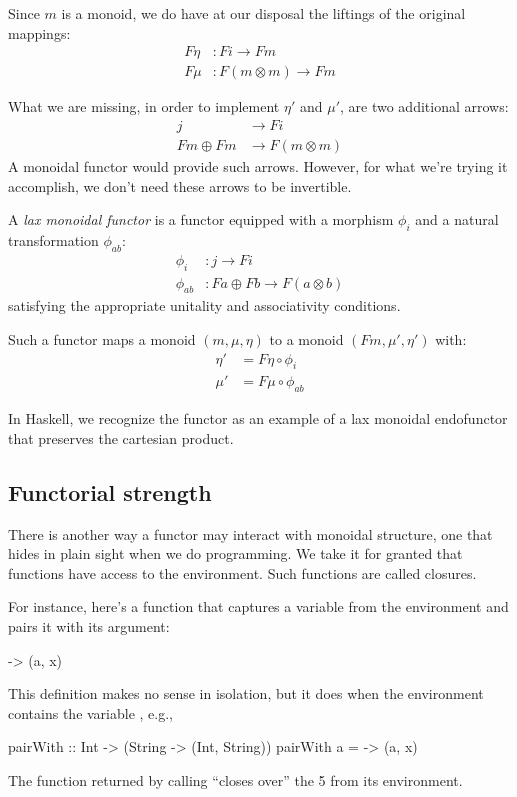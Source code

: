 \documentclass[DaoFP]{subfiles}
\begin{document}
Since $m$ is a monoid, we do have at our disposal the liftings of the original mappings:
\begin{align*}
 F \eta &\colon F i \to F m \\
 F \mu &\colon F (m \otimes m) \to F m
\end{align*}

What we are missing, in order to implement $\eta'$ and $\mu'$, are two additional arrows:
\begin{align*}
j &\to F i\\
 F m \oplus F m &\to F (m \otimes m)
 \end{align*}
A monoidal functor would provide such arrows. However, for what we're trying it accomplish, we don't need these arrows to be invertible. 

A \emph{lax monoidal functor} is a functor equipped with a morphism $\phi_i$ and a natural transformation $\phi_{ab}$:
\begin{align*}
\phi_i &\colon j \to F i \\
\phi_{a b} &\colon F a \oplus F b \to F (a \otimes b)
\end{align*}
satisfying the appropriate unitality and associativity conditions.

Such a functor maps a monoid $(m, \mu, \eta)$ to a monoid $(F m, \mu', \eta')$ with:
\begin{align*}
\eta' &= F \eta \circ \phi_i \\
\mu' &= F \mu \circ \phi_{a b}
\end{align*}

In Haskell, we recognize the  functor as an example of a lax monoidal endofunctor that preserves the cartesian product.

\subsection{Functorial strength}

There is another way a functor may interact with monoidal structure, one that hides in plain sight when we do programming. We take it for granted that functions have access to the environment. Such functions are called closures. 

For instance, here's a function that captures a variable  from the environment and pairs it with its argument:
\begin{haskell}
\x -> (a, x)
\end{haskell}
This definition makes no sense in isolation, but it does when the environment contains the variable , e.g.,
\begin{haskell}
pairWith :: Int -> (String -> (Int, String))
pairWith a = \x -> (a, x)
\end{haskell}
The function returned by calling  ``closes over'' the 5 from its environment.
\end{document}
